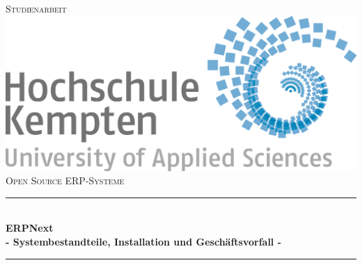 \documentclass[
  fontsize=12pt, %
  a4paper,  %
  oneside,  %
  bibliography=totoc,
  headsepline,
  cleardoublepage=empty,
  parskip=half,
  draft=false
]{scrbook}
\begin{document}
\begin{titlepage}

\newcommand{\HRule}{\rule{\linewidth}{0.5mm}} %

\center %
 

\textsc{\LARGE Studienarbeit}\\[1.5cm] %
\includegraphics[scale=.15]{logos/Logo_Hochschule_Kempten.png}\\[1cm] %
\textsc{\Large Open Source ERP-Systeme}\\[0.5cm] %


\HRule \\[0.4cm]
{ \huge \bfseries ERPNext \\ \Large - Systembestandteile, Installation und Geschäftsvorfall -}\\[0.4cm] %
\HRule \\[1.5cm]
 

\end{titlepage}
\end{document}

